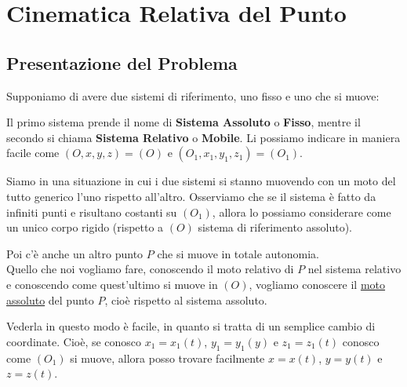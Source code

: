 \documentclass[11pt,a4paper,twoside]{article}
\theoremstyle{definition}
\begin{document}
\newpage

\section{Cinematica Relativa del Punto}\label{Relativo}

\subsection{Presentazione del Problema}

Supponiamo di avere due sistemi di riferimento, uno fisso e uno che si muove:
\begin{center}
\end{center}
Il primo sistema prende il nome di \textbf{Sistema Assoluto} o \textbf{Fisso}, mentre il secondo si chiama \textbf{Sistema Relativo} o \textbf{Mobile}. Li possiamo indicare in maniera facile come $(O,x,y,z) = (O)$ e $(O_1,x_1,y_1,z_1) = (O_1)$.

Siamo in una situazione in cui i due sistemi si stanno muovendo con un moto del tutto generico l'uno rispetto all'altro.
Osserviamo che se il sistema è fatto da infiniti punti e risultano costanti su $(O_1)$, allora lo possiamo considerare come un unico corpo rigido (rispetto a $(O)$ sistema di riferimento assoluto).

Poi c'è anche un altro punto $P$ che si muove in totale autonomia.\\
Quello che noi vogliamo fare, conoscendo il moto relativo di $P$ nel sistema relativo e conoscendo come quest'ultimo si muove in $(O)$, vogliamo conoscere il \underline{moto assoluto} del punto $P$, cioè rispetto al sistema assoluto.

Vederla in questo modo è facile, in quanto si tratta di un semplice cambio di coordinate. Cioè, se conosco $x_1=x_1(t)$, $y_1 = y_1(y)$ e $z_1=z_1(t)$ conosco come $(O_1)$ si muove, allora posso trovare facilmente $x=x(t)$, $y = y(t)$ e $z = z(t)$.
\end{document}
